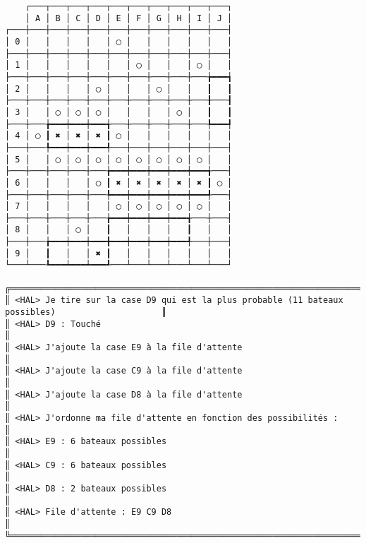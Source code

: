 {\scriptsize
\begin{verbatim}
    ┌───┬───┬───┬───┬───┬───┬───┬───┬───┬───┐
    │ A │ B │ C │ D │ E │ F │ G │ H │ I │ J │
┌───┼───┼───┼───┼───┼───┼───┼───┼───┼───┼───┤
│ 0 │   │   │   │   │ ◯ │   │   │   │   │   │
├───┼───┼───┼───┼───┼───┼───┼───┼───┼───┼───┤
│ 1 │   │   │   │   │   │ ◯ │   │   │ ◯ │   │
├───┼───┼───┼───┼───┼───┼───┼───┼───┼───╆━━━┪
│ 2 │   │   │   │ ◯ │   │   │ ◯ │   │   ┃   ┃
├───┼───┼───┼───┼───┼───┼───┼───┼───┼───╂───┨
│ 3 │   │ ◯ │ ◯ │ ◯ │   │   │   │ ◯ │   ┃   ┃
├───┼───╆━━━┿━━━┿━━━╅───┼───┼───┼───┼───╄━━━┩
│ 4 │ ◯ ┃ ✖ │ ✖ │ ✖ ┃ ◯ │   │   │   │   │   │
├───┼───╄━━━┿━━━┿━━━╃───┼───┼───┼───┼───┼───┤
│ 5 │   │ ◯ │ ◯ │ ◯ │ ◯ │ ◯ │ ◯ │ ◯ │ ◯ │   │
├───┼───┼───┼───┼───╆━━━┿━━━┿━━━┿━━━┿━━━╅───┤
│ 6 │   │   │   │ ◯ ┃ ✖ │ ✖ │ ✖ │ ✖ │ ✖ ┃ ◯ │
├───┼───┼───┼───┼───╄━━━┿━━━┿━━━┿━━━┿━━━╃───┤
│ 7 │   │   │   │   │ ◯ │ ◯ │ ◯ │ ◯ │ ◯ │   │
├───┼───┼───┼───┼───╆━━━┿━━━┿━━━┿━━━╅───┼───┤
│ 8 │   │   │ ◯ │   ┃   │   │   │   ┃   │   │
├───┼───╆━━━┿━━━┿━━━╋━━━┿━━━┿━━━┿━━━╃───┼───┤
│ 9 │   ┃   │   │ ✖ ┃   │   │   │   │   │   │
└───┴───┺━━━┷━━━┷━━━┹───┴───┴───┴───┴───┴───┘

╔══════════════════════════════════════════════════════════════════════════════════════════════════╗
║ <HAL> Je tire sur la case D9 qui est la plus probable (11 bateaux possibles)                     ║
║ <HAL> D9 : Touché                                                                                ║
║ <HAL> J'ajoute la case E9 à la file d'attente                                                    ║
║ <HAL> J'ajoute la case C9 à la file d'attente                                                    ║
║ <HAL> J'ajoute la case D8 à la file d'attente                                                    ║
║ <HAL> J'ordonne ma file d'attente en fonction des possibilités :                                 ║
║ <HAL> E9 : 6 bateaux possibles                                                                   ║
║ <HAL> C9 : 6 bateaux possibles                                                                   ║
║ <HAL> D8 : 2 bateaux possibles                                                                   ║
║ <HAL> File d'attente : E9 C9 D8                                                                  ║
╚══════════════════════════════════════════════════════════════════════════════════════════════════╝
\end{verbatim}}
\newpage

